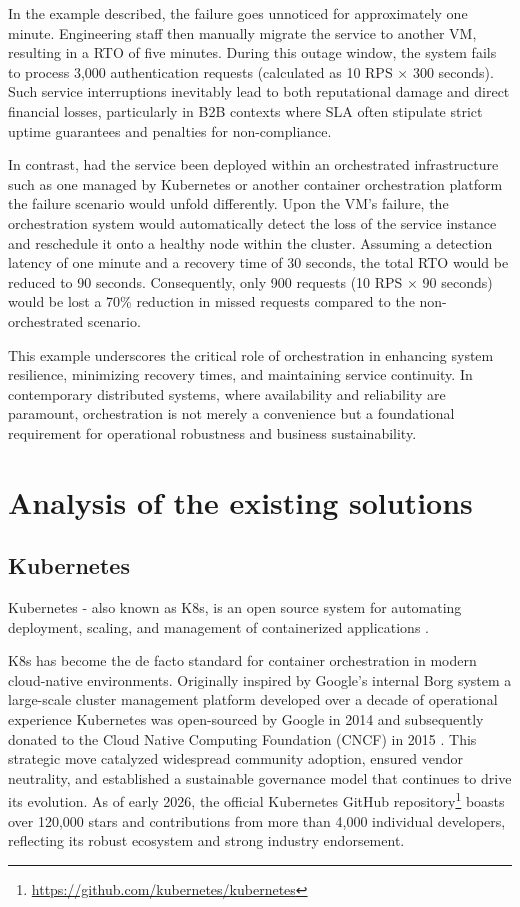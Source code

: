 In the example described, the failure goes unnoticed for approximately one minute. Engineering staff then manually migrate the service to another VM, resulting in a RTO of five minutes. During this outage window, the system fails to process 3,000 authentication requests (calculated as 10 RPS × 300 seconds). Such service interruptions inevitably lead to both reputational damage and direct financial losses, particularly in B2B contexts where SLA often stipulate strict uptime guarantees and penalties for non-compliance.

In contrast, had the service been deployed within an orchestrated infrastructure such as one managed by Kubernetes or another container orchestration platform the failure scenario would unfold differently. Upon the VM’s failure, the orchestration system would automatically detect the loss of the service instance and reschedule it onto a healthy node within the cluster. Assuming a detection latency of one minute and a recovery time of 30 seconds, the total RTO would be reduced to 90 seconds. Consequently, only 900 requests (10 RPS × 90 seconds) would be lost a 70\% reduction in missed requests compared to the non-orchestrated scenario.

This example underscores the critical role of orchestration in enhancing system resilience, minimizing recovery times, and maintaining service continuity. In contemporary distributed systems, where availability and reliability are paramount, orchestration is not merely a convenience but a foundational requirement for operational robustness and business sustainability.

\section{Analysis of the existing solutions}

\subsection{Kubernetes}

Kubernetes - also known as K8s, is an open source system for automating deployment, scaling, and management of containerized applications \cite{k8s_docs}.

K8s has become the de facto standard for container orchestration in modern cloud-native environments. Originally inspired by Google’s internal Borg system \cite{verma2015borg} a large-scale cluster management platform developed over a decade of operational experience Kubernetes was open-sourced by Google in 2014 and subsequently donated to the Cloud Native Computing Foundation (CNCF) in 2015 \cite{burns2016borg}. This strategic move catalyzed widespread community adoption, ensured vendor neutrality, and established a sustainable governance model that continues to drive its evolution. As of early 2026, the official Kubernetes GitHub repository\footnote{\url{https://github.com/kubernetes/kubernetes}} boasts over 120,000 stars and contributions from more than 4,000 individual developers, reflecting its robust ecosystem and strong industry endorsement.

